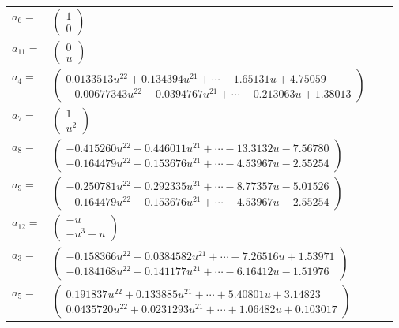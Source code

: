 \documentclass[1p]{elsarticle_modified}
\theoremstyle{definition}
\begin{document}
\begin{tabular}{m{7pt} m{180pt} m{7pt} m{180pt} }
\flushright $a_{6}=$&$\begin{pmatrix}1\\0\end{pmatrix}$ \\
\flushright $a_{11}=$&$\begin{pmatrix}0\\u\end{pmatrix}$ \\
\flushright $a_{4}=$&$\begin{pmatrix}0.0133513 u^{22}+0.134394 u^{21}+\cdots-1.65131 u+4.75059\\-0.00677343 u^{22}+0.0394767 u^{21}+\cdots-0.213063 u+1.38013\end{pmatrix}$ \\
\flushright $a_{7}=$&$\begin{pmatrix}1\\u^2\end{pmatrix}$ \\
\flushright $a_{8}=$&$\begin{pmatrix}-0.415260 u^{22}-0.446011 u^{21}+\cdots-13.3132 u-7.56780\\-0.164479 u^{22}-0.153676 u^{21}+\cdots-4.53967 u-2.55254\end{pmatrix}$ \\
\flushright $a_{9}=$&$\begin{pmatrix}-0.250781 u^{22}-0.292335 u^{21}+\cdots-8.77357 u-5.01526\\-0.164479 u^{22}-0.153676 u^{21}+\cdots-4.53967 u-2.55254\end{pmatrix}$ \\
\flushright $a_{12}=$&$\begin{pmatrix}- u\\- u^3+u\end{pmatrix}$ \\
\flushright $a_{3}=$&$\begin{pmatrix}-0.158366 u^{22}-0.0384582 u^{21}+\cdots-7.26516 u+1.53971\\-0.184168 u^{22}-0.141177 u^{21}+\cdots-6.16412 u-1.51976\end{pmatrix}$ \\
\flushright $a_{5}=$&$\begin{pmatrix}0.191837 u^{22}+0.133885 u^{21}+\cdots+5.40801 u+3.14823\\0.0435720 u^{22}+0.0231293 u^{21}+\cdots+1.06482 u+0.103017\end{pmatrix}$ \\

\end{tabular}
\end{document}
